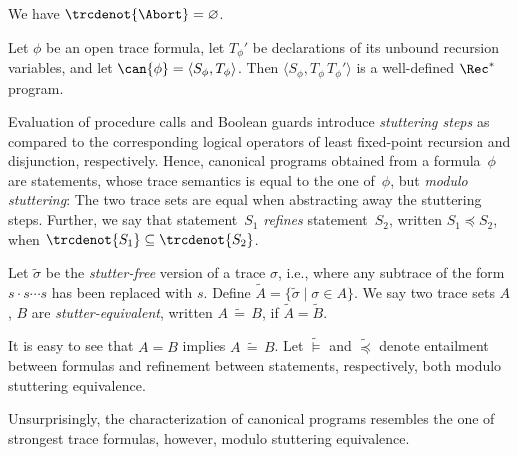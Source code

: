 \documentclass[a4paper,numberwithinsect]{lipics-v2021}
\begin{document}

\begin{proposition}\label{prop:any}
  We have $\trcdenot{\Abort}=\varnothing$.
\end{proposition}

\begin{proposition}\label{prop:well}
  Let $\phi$ be an open trace formula, let $T_\phi'$ be declarations
  of its unbound recursion variables, and let
  $\can{\phi}=\langle S_\phi,T_\phi\rangle$. Then
  $\langle S_\phi,T_\phi\,T_\phi'\rangle$ is a well-defined
  $\Rec^\ast$ program.
\end{proposition}



Evaluation of procedure calls and Boolean guards introduce \emph{stuttering 
steps} as compared to the corresponding logical operators of least
fixed-point recursion and disjunction, respectively. Hence, canonical
programs obtained from a formula~$\phi$ are statements, whose trace
semantics is equal to the one of~$\phi$, but \emph{modulo stuttering}: 
The two trace sets are equal when abstracting away the stuttering steps.
%
Further, we say that statement~$S_1$ \emph{refines} statement~$S_2$,
written $S_1 \preceq S_2$, when $\trcdenot{S_1} \subseteq \trcdenot{S_2}$.

\begin{definition}
  Let $\tilde{\sigma}$ be the \emph{stutter-free} version of a trace
  $\sigma$, i.e., where any subtrace of the form $s\cdot s\cdots s$
  has been replaced with $s$. Define
  $\widetilde{A}=\{\tilde{\sigma}\mid\sigma\in A\}$.  We say two trace
  sets $A$, $B$ are \emph{stutter-equivalent}, written
  $A\,\widetilde{=}\,B$, if $\widetilde{A}=\widetilde{B}$.
\end{definition}

It is easy to see that $A=B$ implies $A\,\widetilde{=}\,B$.
%
Let $\widetilde{\models}$ and $\widetilde{\preceq}$ 
denote entailment between formulas and refinement between
statements, respectively, both modulo stuttering equivalence.

Unsurprisingly, the characterization of canonical programs resembles
the one of strongest trace formulas, however, modulo stuttering
equivalence.
\end{document}
